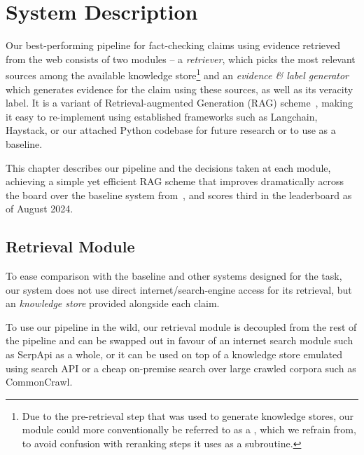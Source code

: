 
\section{System Description}
\label{sec:system}
Our best-performing pipeline for fact-checking claims using evidence retrieved from the web consists of two modules -- a \textit{retriever}, which picks the most relevant sources among the available knowledge store\footnote{Due to the pre-retrieval step that was used to generate knowledge stores, our  module could more conventionally be referred to as a , which we refrain from, to avoid confusion with reranking steps it uses as a subroutine.} and an \textit{evidence \& label generator} which generates evidence for the claim using these sources, as well as its veracity label. 
It is a variant of Retrieval-augmented Generation (RAG) scheme~\cite{rag}, making it easy to re-implement using established frameworks such as Langchain, Haystack, or our attached Python codebase for future research or to use as a baseline.

This chapter describes our pipeline and the decisions taken at each module, achieving a simple yet efficient RAG scheme that improves dramatically across the board over the baseline system from~\cite{averitec2024}, and scores third in the \averitec{}  leaderboard as of August 2024.

\subsection{Retrieval Module}
To ease comparison with the baseline and other systems designed for the task, our system does not use direct internet/search-engine access for its retrieval, but an \averitec{} \textit{knowledge store} provided alongside each claim.

To use our pipeline in the wild, our retrieval module is decoupled from the rest of the pipeline and can be swapped out in favour of an internet search module such as SerpApi as a whole, or it can be used on top of a knowledge store emulated using search API or a cheap on-premise search over large crawled corpora such as CommonCrawl.


